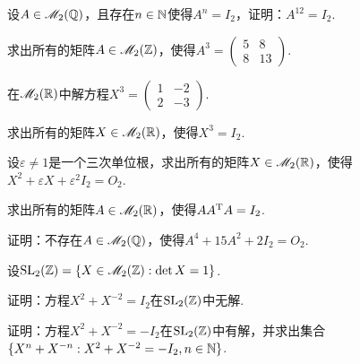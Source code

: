 \begin{mybox}
  \begin{problem}[$\MM_2(\MQ)$中元素的阶.]

     设$A\in\mathscr M_2(\mathbb Q)$，且存在$n\in\mathbb N$使得$A^n=I_2$，证明：$A^{12}=I_2$.
  \end{problem}
\end{mybox}

\begin{problem}
  求出所有的矩阵$A\in\mathscr M_2(\mathbb Z)$，使得$A^3=\begin{pmatrix}
    5 & 8 \\
    8 & 13
  \end{pmatrix}$.
\end{problem}

\begin{problem}
  在$\mathscr M_2(\mathbb R)$中解方程$X^3=\begin{pmatrix}
    1 & -2 \\
    2 & -3
  \end{pmatrix}$.
\end{problem}

\begin{mybox}
  \begin{problem}[$I_2$的实三次方根.]
    \begin{enum}
      \item\label{prob3.67a} 求出所有的矩阵$X\in\mathscr M_2(\mathbb R)$，使得$X^3=I_2$.
      \item 设$\varepsilon\ne1$是一个三次单位根，求出所有的矩阵$X\in\mathscr M_2(\mathbb R)$，使得$X^2+\varepsilon X+\varepsilon^2I_2=O_2$.
    \end{enum}
  \end{problem}
\end{mybox}

\begin{mybox}
  \begin{problem}
    求出所有的矩阵$A\in\mathscr M_2(\mathbb R)$，使得$AA^{\mathrm T} A=I_2$.
  \end{problem}
\end{mybox}

\begin{problem}
  证明：不存在$A\in\mathscr M_2(\mathbb Q)$，使得$A^4+15A^2+2I_2=O_2$.
\end{problem}

\begin{problem}
  设$\operatorname{SL}_2(\mathbb Z)=\{X\in\mathscr M_2(\mathbb Z):\det X=1\}$.
  \begin{enum}
    \item 证明：方程$X^2+X^{-2}=I_2$在$\operatorname{SL}_2(\mathbb Z)$中无解.
    \item 证明：方程$X^2+X^{-2}=-I_2$在$\operatorname{SL}_2(\mathbb Z)$中有解，并求出集合$\{X^n+X^{-n}:X^2+X^{-2}=-I_2,n\in\mathbb N\}$.
  \end{enum}
\end{problem}

